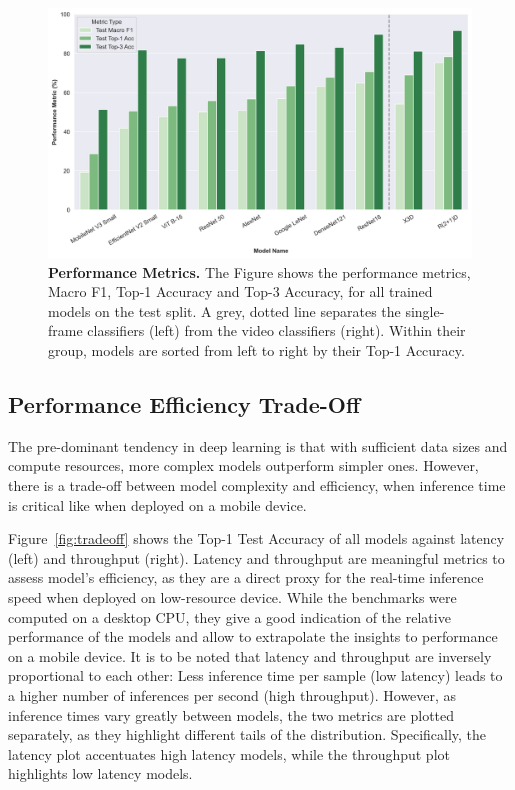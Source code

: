 \documentclass[a4paper]{article}
\begin{document}
  \begin{figure}
    \begin{center}
      \includegraphics[width=.95\textwidth]
      {./figures/performance-metrics.png}
    \end{center}

    \caption{\textbf{Performance Metrics.} The Figure shows the performance
      metrics, Macro F1, Top-1 Accuracy and Top-3 Accuracy, for all trained
      models on the test split. A grey, dotted line separates the single-frame
      classifiers (left) from the video classifiers (right). Within their group,
      models are sorted from left to right by their Top-1 Accuracy.}

    \label{fig:performance-metrics}
  \end{figure}

  \subsection{Performance Efficiency Trade-Off} %
  \label{sub:tradeoff}

  The pre-dominant tendency in deep learning is that with sufficient data sizes
  and compute resources, more complex models outperform simpler ones. However,
  there is a trade-off between model complexity and efficiency, when inference
  time is critical like when deployed on a mobile device. 

  Figure~\ref{fig:tradeoff} shows the Top-1 Test Accuracy of all models against
  latency (left) and throughput (right). Latency and throughput are meaningful
  metrics to assess model's efficiency, as they are a direct proxy for the
  real-time inference speed when deployed on low-resource device. While the
  benchmarks were computed on a desktop CPU, they give a good indication of the
  relative performance of the models and allow to extrapolate the insights to
  performance on a mobile device. It is to be noted that latency and throughput
  are inversely proportional to each other: Less inference time per sample (low
  latency) leads to a higher number of inferences per second (high throughput).
  However, as inference times vary greatly between models, the two metrics are
  plotted separately, as they highlight different tails of the distribution.
  Specifically, the latency plot accentuates high latency models, while the
  throughput plot highlights low latency models.
\end{document}
